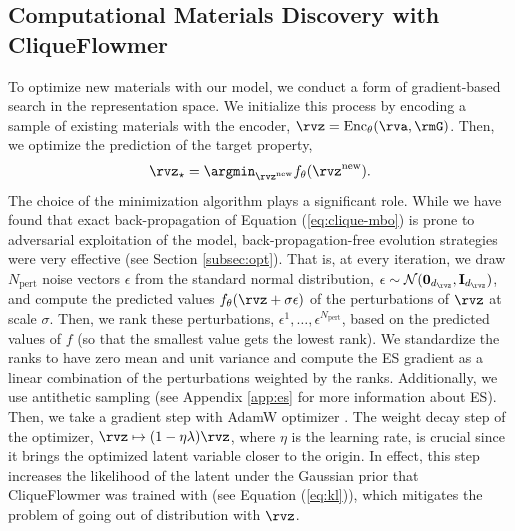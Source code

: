 \documentclass{article}
\theoremstyle{plain}
\theoremstyle{definition}
\theoremstyle{remark}
\begin{document}
\subsection{Computational Materials Discovery with CliqueFlowmer}
\label{sec:CMD-clique}
To optimize new materials with our model, we conduct a form of gradient-based search in the representation space.
We initialize this process by encoding a sample of existing materials with the encoder, $\rvz=\text{Enc}_{\theta}(\rva, \rmG)$.
Then, we optimize the prediction of the target property,
\begin{align}
    \label{eq:clique-mbo}
    \vspace{-10pt}
    \rvz_{\star} = \argmin_{\rvz^{\text{new}}}f_{\theta}(\rvz^{\text{new}}).
\end{align}
The choice of the minimization algorithm plays a significant role. 
While we have found that exact back-propagation of Equation (\ref{eq:clique-mbo}) is prone to adversarial exploitation of the model,
back-propagation-free evolution strategies \citep[ES]{salimans2017evolution} were very effective (see Section \ref{subsec:opt}).
That is, at every iteration, we draw $N_{\text{pert}}$ noise vectors $\epsilon$ from the standard normal distribution, $\epsilon \sim \mathcal{N}(\mathbf{0}_{d_{\rvz}}, \mathbf{I}_{d_{\rvz}})$, and compute the predicted values $f_{\theta}(\rvz + \sigma \epsilon)$ of the perturbations of $\rvz$ at scale $\sigma$. 
Then, we rank these perturbations, $\epsilon^1, \dots, \epsilon^{N_{\text{pert}}}$, based on the predicted values of $f$ (so that the smallest value gets the lowest rank). 
We standardize the ranks to have zero mean and unit variance and compute the ES gradient as a linear combination of the perturbations weighted by the ranks.
Additionally, we use antithetic sampling (see Appendix \ref{app:es} for more information about ES).
Then, we take a gradient step with AdamW optimizer \citep{loshchilov2017fixing}. 
The weight decay step of the optimizer, $\rvz \mapsto (1-\eta\lambda)\rvz$, where $\eta$ is the learning rate, is crucial since it brings the optimized latent variable closer to the origin.
In effect, this step increases the likelihood of the latent under the Gaussian prior that CliqueFlowmer was trained with (see Equation (\ref{eq:kl})), which mitigates the problem of going out of distribution with $\rvz$.
\end{document}

